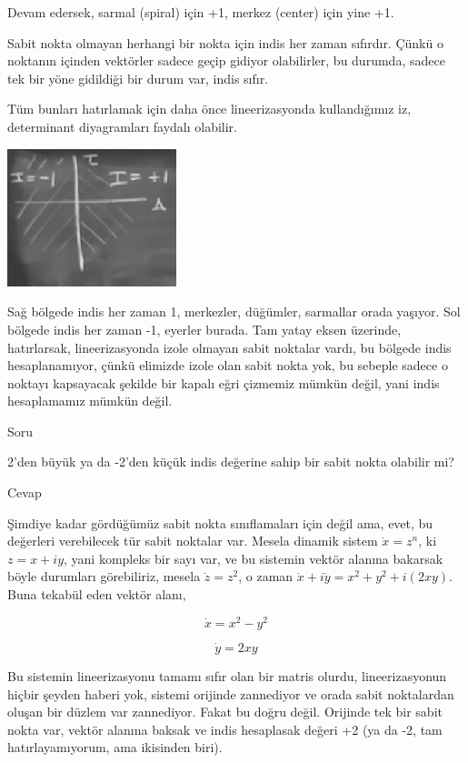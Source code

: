 \documentclass[12pt,fleqn]{article}\usepackage{../../common}
\begin{document}
Devam edersek, sarmal (spiral) için +1, merkez (center) için yine +1.

Sabit nokta olmayan herhangi bir nokta için indis her zaman sıfırdır. Çünkü o
noktanın içinden vektörler sadece geçip gidiyor olabilirler, bu durumda, sadece
tek bir yöne gidildiği bir durum var, indis sıfır.

Tüm bunları hatırlamak için daha önce lineerizasyonda kullandığımız iz,
determinant diyagramları faydalı olabilir. 

\includegraphics[height=4cm]{08_30.png}

Sağ bölgede indis her zaman 1, merkezler, düğümler, sarmallar orada
yaşıyor. Sol bölgede indis her zaman -1, eyerler burada. Tam yatay eksen
üzerinde, hatırlarsak, lineerizasyonda izole olmayan sabit noktalar vardı, bu
bölgede indis hesaplanamıyor, çünkü elimizde izole olan sabit nokta yok, bu
sebeple sadece o noktayı kapsayacak şekilde bir kapalı eğri çizmemiz mümkün
değil, yani indis hesaplamamız mümkün değil.

Soru

2'den büyük ya da -2'den küçük indis değerine sahip bir sabit nokta olabilir
mi?

Cevap

Şimdiye kadar gördüğümüz sabit nokta sınıflamaları için değil ama, evet, bu
değerleri verebilecek tür sabit noktalar var. Mesela dinamik sistem $\dot{x} =
z^n$, ki $z = x + iy$, yani kompleks bir sayı var, ve bu sistemin vektör alanına
bakarsak böyle durumları görebiliriz, mesela $\dot{z} = z^2$, o zaman $\dot{x} +
i\dot{y} = x^2 + y^2 + i(2xy)$. Buna tekabül eden vektör alanı,

$$ \dot{x} = x^2 - y^2 $$

$$ \dot{y} = 2xy $$

Bu sistemin lineerizasyonu tamamı sıfır olan bir matris olurdu, lineerizasyonun
hiçbir şeyden haberi yok, sistemi orijinde zannediyor ve orada sabit noktalardan
oluşan bir düzlem var zannediyor. Fakat bu doğru değil. Orijinde tek bir sabit
nokta var, vektör alanına baksak ve indis hesaplasak değeri +2 (ya da -2, tam
hatırlayamıyorum, ama ikisinden biri).
\end{document}
